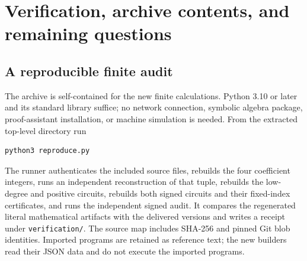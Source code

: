 \section{Verification, archive contents, and remaining questions}
\label{sec:verification}

\subsection{A reproducible finite audit}

The archive is self-contained for the new finite calculations. Python 3.10
or later and its standard library suffice; no network connection, symbolic
algebra package, proof-assistant installation, or machine simulation is
needed. From the extracted top-level directory run
\begin{lstlisting}
python3 reproduce.py
\end{lstlisting}
The runner authenticates the included source files, rebuilds the four
coefficient integers, runs an independent reconstruction of that tuple,
rebuilds the low-degree and positive circuits, rebuilds both signed
circuits and their fixed-index certificates, and runs the independent
signed audit. It compares the regenerated literal mathematical artifacts
with the delivered versions and writes a receipt under
\texttt{verification/}. The source map includes SHA-256 and pinned Git
blob identities. Imported programs are retained as reference text;
the new builders read their JSON data and do not execute the imported
programs.

